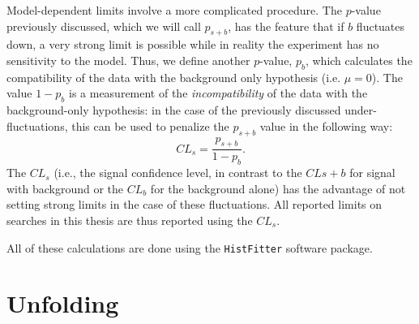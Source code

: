 Model-dependent limits involve a more complicated procedure. The $p$-value previously discussed, which we will call $p_{s+b}$, has the feature that if $b$ fluctuates down, a very strong limit is possible while in reality the experiment has no sensitivity to the model. Thus, we define another $p$-value, $p_b$, which calculates the compatibility of the data with the background only hypothesis (i.e. $\mu=0$). The value $1-p_b$ is a measurement of the \textit{incompatibility} of the data with the background-only hypothesis: in the case of the previously discussed under-fluctuations, this can be used to penalize the $p_{s+b}$ value in the following way:
%
\begin{equation}
CL_s = \frac{p_{s+b}}{1-p_b}.
\end{equation} 
%
The $CL_s$ (i.e., the signal confidence level, in contrast to the $CL{s+b}$ for signal with background or the $CL_b$ for the background alone) has the advantage of not setting strong limits in the case of these fluctuations. All reported limits on searches in this thesis are thus reported using the $CL_s$.

All of these calculations are done using the \texttt{HistFitter} software package. 

\section{Unfolding}